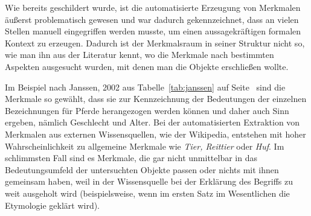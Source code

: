 \documentclass[pagesize,paper=A4,DIV=calc,fontsize=12pt,draft=false]{scrreprt}
\begin{document}
Wie bereits geschildert wurde, ist die automatisierte Erzeugung von Merkmalen äußerst problematisch gewesen und war dadurch gekennzeichnet, dass an vielen Stellen manuell eingegriffen werden musste, um einen aussagekräftigen formalen Kontext zu erzeugen. 
Dadurch ist der Merkmalsraum in seiner Struktur nicht so, wie man ihn aus der Literatur kennt, wo die Merkmale nach bestimmten Aspekten ausgesucht wurden, mit denen man die Objekte erschließen wollte.

Im Beispiel nach Janssen, 2002 aus Tabelle~\ref{tab:janssen} auf Seite~\pageref{tab:janssen} sind die Merkmale so gewählt, dass sie zur Kennzeichnung der Bedeutungen der einzelnen Bezeichnungen für Pferde herangezogen werden können und daher auch Sinn ergeben, nämlich Geschlecht und Alter.
Bei der automatisierten Extraktion von Merkmalen aus externen Wissensquellen, wie der Wikipedia, entstehen mit hoher Wahrscheinlichkeit zu allgemeine Merkmale wie \emph{Tier, Reittier} oder \emph{Huf}.
Im schlimmsten Fall sind es Merkmale, die gar nicht unmittelbar in das Bedeutungsumfeld der untersuchten Objekte passen oder nichts mit ihnen gemeinsam haben, weil in der Wissensquelle bei der Erklärung des Begriffs zu weit ausgeholt wird (beispielsweise, wenn im ersten Satz im Wesentlichen die Etymologie geklärt wird).
\end{document}

